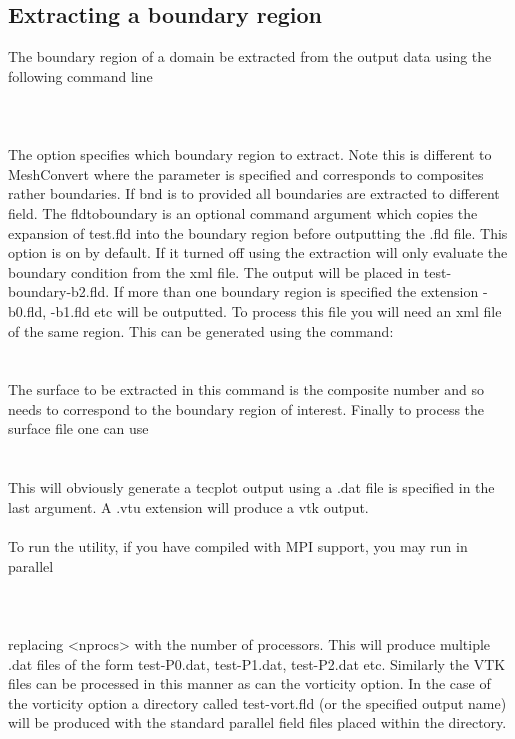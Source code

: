 \subsection{Extracting a boundary region}
The boundary region of a domain be extracted from the output data using the following command line\\
\\
\\
\\
The option  specifies which boundary region to extract. Note this is different to MeshConvert where the parameter  is specified and corresponds to composites rather boundaries. If bnd is to provided all boundaries are extracted to different field. The fldtoboundary is an optional command argument which copies the expansion of test.fld into the boundary region before outputting the .fld file. This option is on by default. If it turned off using  the extraction will only evaluate the boundary condition from the xml file. The output will be placed in test-boundary-b2.fld. If more than one boundary region is specified the extension -b0.fld, -b1.fld etc will be outputted. To process this file you will need an xml file of the same region. This can be generated using the command:
\\
\\
\\
The surface to be extracted in this command is the composite number and so needs to correspond to the boundary region of interest. Finally to process the surface file one can use
\\
\\
\\
This will obviously generate a tecplot output using a .dat file is specified in the last argument. A .vtu extension will produce a vtk output.\\
\\
To run the utility, if you have compiled \nekpp with MPI support, you may run in parallel\\
\\
\\
\\
replacing <nprocs> with the number of processors. This will produce multiple .dat files of the form test-P0.dat, test-P1.dat, test-P2.dat etc. Similarly the VTK files can be processed in this manner as can the vorticity option. In the case of the vorticity option a directory called test-vort.fld (or the specified output name) will be produced with the standard parallel field files placed within the directory.
